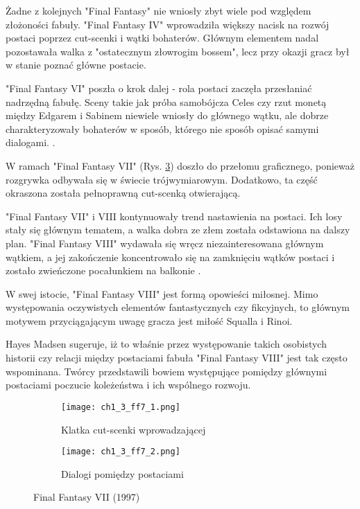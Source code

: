 \newpage

Żadne z kolejnych "Final Fantasy" nie wniosły zbyt wiele pod względem złożoności fabuły. "Final Fantasy
IV" wprowadziła większy nacisk na rozwój postaci poprzez cut-scenki i wątki bohaterów. Głównym elementem
nadal pozostawała walka z "ostatecznym złowrogim bossem", lecz przy okazji gracz był w stanie poznać
główne postacie\cite{the_evolution_of_final_fantasy}.

"Final Fantasy VI" poszła o krok dalej - rola postaci zaczęła przesłaniać nadrzędną fabułę. Sceny takie
jak próba samobójcza Celes czy rzut monetą między Edgarem i Sabinem niewiele wniosły do głównego wątku,
ale dobrze charakteryzowały bohaterów w sposób, którego nie sposób opisać samymi dialogami.
\cite{the_evolution_of_final_fantasy}.

W ramach "Final Fantasy VII" (Rys. \ref{fig:ch1_3_ff7}) doszło do przełomu graficznego, ponieważ
rozgrywka odbywała się w świecie trójwymiarowym. Dodatkowo, ta część okraszona została pełnoprawną
cut-scenką otwierającą.

"Final Fantasy VII" i VIII kontynuowały trend nastawienia na postaci.
Ich losy stały się głównym tematem, a walka dobra ze złem została odstawiona na dalszy plan.
"Final Fantasy VIII" wydawała się wręcz niezainteresowana głównym wątkiem, a jej zakończenie
koncentrowało się na zamknięciu wątków postaci i zostało zwieńczone pocałunkiem na balkonie
\cite{the_evolution_of_final_fantasy}.

W swej istocie, "Final Fantasy VIII" jest formą opowieści miłosnej. Mimo występowania oczywistych
elementów fantastycznych czy fikcyjnych, to głównym motywem przyciągającym uwagę gracza jest
miłość Squalla i Rinoi\cite{25_years_later}.

Hayes Madsen sugeruje, iż to właśnie przez występowanie takich osobistych historii czy relacji między
postaciami fabuła "Final Fantasy VIII" jest tak często wspominana. Twórcy przedstawili bowiem występujące
pomiędzy głównymi postaciami poczucie koleżeństwa i ich wspólnego rozwoju\cite{25_years_later}.

\begin{figure}[h]
	\begin{subfigure}{0.49\textwidth}
		\caption{Klatka cut-scenki wprowadzającej}
		\texttt{[image: ch1\_3\_ff7\_1.png]}
		\label{subfig:ch_1_3_ff7_1}
	\end{subfigure}
	\begin{subfigure}{0.49\textwidth}
		\caption{Dialogi pomiędzy postaciami}
		\texttt{[image: ch1\_3\_ff7\_2.png]}
		\label{subfig:ch_1_3_ff7_2}
	\end{subfigure}
	\caption{Final Fantasy VII (1997)}
	\label{fig:ch1_3_ff7}
\end{figure}

